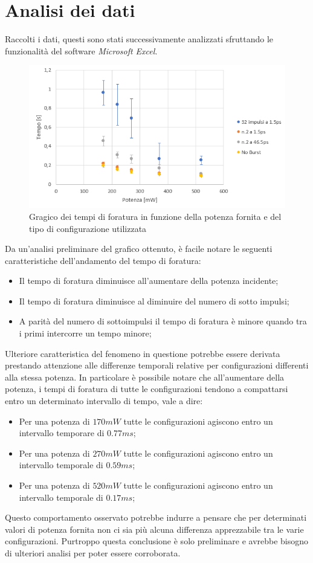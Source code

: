 \documentclass{article}
\begin{document}
\section{Analisi dei dati}
Raccolti i dati, questi sono stati successivamente analizzati sfruttando le funzionalità del software \textit{Microsoft Excel}.
\begin{figure}[h!]
    \centering
    \includegraphics[width=\linewidth]{grafico-foratura.png}
    \caption{Gragico dei tempi di foratura in funzione della potenza fornita e del tipo di configurazione utilizzata}
    \label{fig:Grafico_foratura}
\end{figure}
Da un'analisi preliminare del grafico ottenuto, è facile notare le seguenti caratteristiche dell'andamento del tempo di foratura:
\begin{itemize}
    \item Il tempo di foratura diminuisce all’aumentare della potenza incidente;
    \item Il tempo di foratura diminuisce al diminuire del numero di sotto impulsi;
    \item A parità del numero di sottoimpulsi il tempo di foratura è minore quando tra i primi intercorre un tempo minore;
\end{itemize}

Ulteriore caratteristica del fenomeno in questione potrebbe essere derivata prestando attenzione alle differenze temporali relative per configurazioni differenti alla stessa potenza. In particolare è possibile notare che all'aumentare della potenza, i tempi di foratura di tutte le configurazioni tendono a compattarsi entro un determinato intervallo di tempo, vale a dire:
\begin{itemize}
    \item Per una potenza di $170 mW$ tutte le configurazioni agiscono entro un intervallo temporare di $0.77 ms$;
    \item Per una potenza di $270 mW$ tutte le configurazioni agiscono entro un intervallo temporale di $0.59 ms$;
    \item Per una potenza di $520 mW$ tutte le configurazioni agiscono entro un intervallo temporale di $0.17 ms$;
\end{itemize}
Questo comportamento osservato potrebbe indurre a pensare che per determinati valori di potenza fornita non ci sia più alcuna differenza apprezzabile tra le varie configurazioni.
Purtroppo questa conclusione è solo preliminare e avrebbe bisogno di ulteriori analisi per poter essere corroborata.
\end{document}
